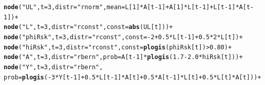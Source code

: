\documentclass{article}\usepackage[]{graphicx}\usepackage[]{color}
\makeatletter
\newcommand{\hlnum}[1]{\textcolor[rgb]{0.686,0.059,0.569}{#1}}%
\newcommand{\hlstr}[1]{\textcolor[rgb]{0.192,0.494,0.8}{#1}}%
\newcommand{\hlopt}[1]{\textcolor[rgb]{0,0,0}{#1}}%
\newcommand{\hlstd}[1]{\textcolor[rgb]{0.345,0.345,0.345}{#1}}%
\newcommand{\hlkwc}[1]{\textcolor[rgb]{0.333,0.667,0.333}{#1}}%
\newcommand{\hlkwd}[1]{\textcolor[rgb]{0.737,0.353,0.396}{\textbf{#1}}}%
\newenvironment{kframe}{%
 \def\at@end@of@kframe{}%
 \ifinner\ifhmode%
  \def\at@end@of@kframe{\end{minipage}}%
  \begin{minipage}{\columnwidth}%
 \fi\fi%
 \def\FrameCommand##1{\hskip\@totalleftmargin \hskip-\fboxsep
 \colorbox{shadecolor}{##1}\hskip-\fboxsep
     \hskip-\linewidth \hskip-\@totalleftmargin \hskip\columnwidth}%
 \MakeFramed {\advance\hsize-\width
   \@totalleftmargin\z@ \linewidth\hsize
   \@setminipage}}%
 {\par\unskip\endMakeFramed%
 \at@end@of@kframe}
\newenvironment{knitrout}{}{} %
\makeatother
\begin{document}
\begin{knitrout}
\begin{kframe}
\begin{alltt}
    \hlkwd{node}\hlstd{(}\hlstr{"UL"}\hlstd{,}\hlkwc{t} \hlstd{=} \hlnum{3}\hlstd{,} \hlkwc{distr} \hlstd{=} \hlstr{"rnorm"}\hlstd{,} \hlkwc{mean} \hlstd{= L[}\hlnum{1}\hlstd{]} \hlopt{*} \hlstd{A[t}\hlopt{-}\hlnum{1}\hlstd{]} \hlopt{+} \hlstd{A[}\hlnum{1}\hlstd{]}\hlopt{*}\hlstd{L[t}\hlopt{-}\hlnum{1}\hlstd{]} \hlopt{+} \hlstd{L[t}\hlopt{-}\hlnum{1}\hlstd{]}\hlopt{*}\hlstd{A[t}\hlopt{-}\hlnum{1}\hlstd{])} \hlopt{+}
    \hlkwd{node}\hlstd{(}\hlstr{"L"}\hlstd{,} \hlkwc{t} \hlstd{=} \hlnum{3}\hlstd{,} \hlkwc{distr} \hlstd{=} \hlstr{"rconst"}\hlstd{,} \hlkwc{const} \hlstd{=} \hlkwd{abs}\hlstd{(UL[t]))} \hlopt{+}
    \hlkwd{node}\hlstd{(}\hlstr{"phiRsk"}\hlstd{,} \hlkwc{t} \hlstd{=} \hlnum{3}\hlstd{,} \hlkwc{distr} \hlstd{=} \hlstr{"rconst"}\hlstd{,} \hlkwc{const} \hlstd{=} \hlopt{-}\hlnum{2} \hlopt{+} \hlnum{0.5}\hlopt{*}\hlstd{L[t}\hlopt{-}\hlnum{1}\hlstd{]} \hlopt{+} \hlnum{0.5}\hlopt{*}\hlnum{2}\hlopt{*}\hlstd{L[t])} \hlopt{+}
    \hlkwd{node}\hlstd{(}\hlstr{"hiRsk"}\hlstd{,} \hlkwc{t} \hlstd{=} \hlnum{3}\hlstd{,} \hlkwc{distr} \hlstd{=} \hlstr{"rconst"}\hlstd{,} \hlkwc{const} \hlstd{=} \hlkwd{plogis}\hlstd{(phiRsk[t])} \hlopt{>} \hlnum{0.80}\hlstd{)} \hlopt{+}
    \hlkwd{node}\hlstd{(}\hlstr{"A"}\hlstd{,} \hlkwc{t} \hlstd{=} \hlnum{3}\hlstd{,} \hlkwc{distr} \hlstd{=} \hlstr{"rbern"}\hlstd{,} \hlkwc{prob} \hlstd{= A[t}\hlopt{-}\hlnum{1}\hlstd{]}\hlopt{*}\hlkwd{plogis}\hlstd{(}\hlnum{1.7} \hlopt{-} \hlnum{2.0}\hlopt{*}\hlstd{hiRsk[t]))} \hlopt{+}
    \hlkwd{node}\hlstd{(}\hlstr{"Y"}\hlstd{,} \hlkwc{t} \hlstd{=} \hlnum{3}\hlstd{,} \hlkwc{distr} \hlstd{=} \hlstr{"rbern"}\hlstd{,}
      \hlkwc{prob} \hlstd{=} \hlkwd{plogis}\hlstd{(}\hlopt{-}\hlnum{3}\hlopt{*}\hlstd{Y[t}\hlopt{-}\hlnum{1}\hlstd{]} \hlopt{+} \hlnum{0.5}\hlopt{*}\hlstd{L[t}\hlopt{-}\hlnum{1}\hlstd{]}\hlopt{*}\hlstd{A[t]} \hlopt{+} \hlnum{0.5}\hlopt{*}\hlstd{A[t}\hlopt{-}\hlnum{1}\hlstd{]}\hlopt{*}\hlstd{L[t]} \hlopt{+} \hlnum{0.5}\hlopt{*}\hlstd{L[t]}\hlopt{*}\hlstd{A[t]))} \hlopt{+}


\end{alltt}
\end{kframe}
\end{knitrout}
\end{document}
